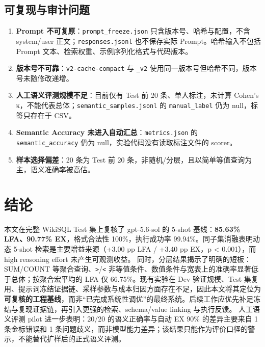 \documentclass[conference]{IEEEtran}
\begin{document}
\subsection{可复现与审计问题}
\begin{enumerate}
\item \textbf{Prompt 不可复原}：\texttt{prompt\_freeze.json} 只含版本号、哈希与配置，不含 system/user 正文；\texttt{responses.jsonl} 也不保存实际 Prompt。哈希输入不包括 Prompt 文本、检索权重、示例序列化格式与代码版本。
\item \textbf{版本号不可靠}：\texttt{v2-cache-compact} 与 \texttt{\_v2} 使用同一版本号但哈希不同，版本号未随修改递增。
\item \textbf{人工语义评测规模不足}：目前仅有 Test 前 20 条、单人标注，未计算 Cohen's κ，不能代表总体；\texttt{semantic\_samples.jsonl} 的 \texttt{manual\_label} 仍为 null，标签只存在于 CSV。
\item \textbf{Semantic Accuracy 未进入自动汇总}：\texttt{metrics.json} 的 \texttt{semantic\_accuracy} 仍为 null，实验代码没有读取标注文件的 scorer。
\item \textbf{样本选择偏差}：20 条为 Test 前 20 条，非随机/分层，且以简单等值查询为主，语义准确率被高估。
\end{enumerate}
\section{结论}
本文在完整 WikiSQL Test 集上复核了 gpt-5.6-sol 的 5-shot 基线：\textbf{85.63\% LFA、90.77\% EX}，格式合法性 100\%，执行成功率 99.94\%。同子集消融表明动态 5-shot 检索是主要增益来源（+3.00 pp LFA / +3.40 pp EX，p \textless{} 0.001），而 high reasoning effort 未产生可观测收益。
同时，分层结果揭示了明确的短板：SUM/COUNT 等聚合查询、\texttt{\textgreater{}}/\texttt{\textless{}} 非等值条件、数值条件与宽表上的准确率显著低于总体；按聚合宏平均的 LFA 仅 66.75\%。现有实验在 Dev 验证规模、Test 集复用、提示词冻结证据链、采样参数与成本归因方面存在不足，因此本文将其定位为\textbf{可复核的工程基线}，而非“已完成系统性调优”的最终系统。后续工作应优先补足冻结与复现证据链，再引入更强的检索、schema/value linking 与执行反馈。
人工语义评测 pilot 进一步表明：20/20 的语义正确率与自动 EX 90\% 的差异主要来自 1 条金标错误和 1 条问题歧义，而非模型能力差异；该结果只能作为评价口径的警示，不能替代扩样后的正式语义评测。
\appendices
\needspace{6cm}
\end{document}
